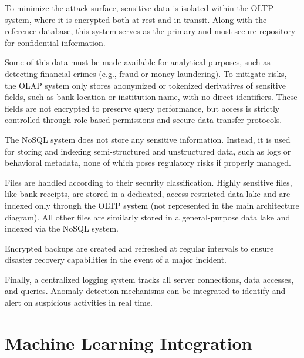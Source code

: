 \documentclass[11pt,a4paper,computermodern]{article}
\begin{document}
To minimize the attack surface, sensitive data is isolated within the OLTP system, where it is encrypted both at rest and in transit. Along with the reference database, this system serves as the primary and most secure repository for confidential information.

Some of this data must be made available for analytical purposes, such as detecting financial crimes (e.g., fraud or money laundering). To mitigate risks, the OLAP system only stores anonymized or tokenized derivatives of sensitive fields, such as bank location or institution name, with no direct identifiers. These fields are not encrypted to preserve query performance, but access is strictly controlled through role-based permissions and secure data transfer protocols.

The NoSQL system does not store any sensitive information. Instead, it is used for storing and indexing semi-structured and unstructured data, such as logs or behavioral metadata, none of which poses regulatory risks if properly managed.

Files are handled according to their security classification. Highly sensitive files, like bank receipts, are stored in a dedicated, access-restricted data lake and are indexed only through the OLTP system (not represented in the main architecture diagram). All other files are similarly stored in a general-purpose data lake and indexed via the NoSQL system.

Encrypted backups are created and refreshed at regular intervals to ensure disaster recovery capabilities in the event of a major incident.

Finally, a centralized logging system tracks all server connections, data accesses, and queries. Anomaly detection mechanisms can be integrated to identify and alert on suspicious activities in real time.


\section*{Machine Learning Integration}
\end{document}
